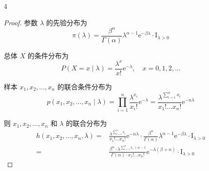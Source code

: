 \documentclass[normal,founder,mtpro2,cn]{elegantnote}
\begin{document}
\begin{enumerate}
\begin{proof}
\begin{enumerate}
                      即，
                      \begin{equation*}
                          \theta\mid x_{1},x_{2},\ldots,x_{n}\sim\text{Be}\left(n+1,\sum_{i=1}^{n}x_{i}+1\right)
                      \end{equation*}
                \item
                      在给定样本 $4,3,1,6$ 的条件下，$\theta$ 的后验分布为
                      \begin{equation*}
                          \theta\mid x_{1},x_{2},x_{3},x_{4}\sim\text{Be}\left(5,15\right)
                      \end{equation*}

                      若采用后验期望估计，则 $\theta$ 的贝叶斯估计为
                      \begin{equation*}
                          \hat{\theta}_{B}=\frac{5}{5+15}=0.25
                      \end{equation*}
            \end{enumerate}
        \end{proof}
    \item[4]
        \begin{proof}
            参数 $\lambda$ 的先验分布为
            \begin{equation*}
                \pi(\lambda)=\frac{\beta^{\alpha}}{\Gamma(\alpha)}\lambda^{\alpha-1}\mathrm{e}^{-\beta\lambda}\cdot\mathrm{I}_{\lambda>0}
            \end{equation*}

            总体 $X$ 的条件分布为
            \begin{equation*}
                P(X=x\mid\lambda)=\frac{\lambda^{x}}{x!}\mathrm{e}^{-\lambda},\quad x=0,1,2,\ldots
            \end{equation*}

            样本 $x_{1},x_{2},\ldots,x_{n}$ 的联合条件分布为
            \begin{equation*}
                p\left(x_{1},x_{2},\ldots,x_{n}\mid\lambda\right)=\prod_{i=1}^{n}\frac{\lambda^{x_{i}}}{x_{i}!}\mathrm{e}^{-\lambda}=\frac{\lambda^{\sum_{i=1}^{n}x_{i}}}{x_{1}!\ldots x_{n}!}\mathrm{e}^{-n\lambda}
            \end{equation*}

            则 $x_{1},x_{2},\ldots,x_{n}$ 和 $\lambda$ 的联合分布为
            \begin{equation*}
                \begin{aligned}
                    h\left(x_{1},x_{2},\ldots,x_{n},\lambda\right) = & \frac{\lambda^{\sum_{i=1}^{n}x_{i}}}{x_{1}!\ldots x_{n}!}\mathrm{e}^{-n\lambda}\cdot\frac{\beta^{\alpha}}{\Gamma(\alpha)}\lambda^{\alpha-1}\mathrm{e}^{-\beta\lambda}\cdot\mathrm{I}_{\lambda>0} \\
                    =                                                & \frac{\beta^{\alpha}\cdot\lambda^{\sum_{i=1}^{n}x_{i}+\alpha-1}}{\Gamma(\alpha)\cdot x_{1}!\ldots x_{n}!}\mathrm{e}^{-\lambda\left(\beta+n\right)}\cdot\mathrm{I}_{\lambda>0}
                \end{aligned}
            \end{equation*}


\end{proof}
\end{enumerate}
\end{document}
